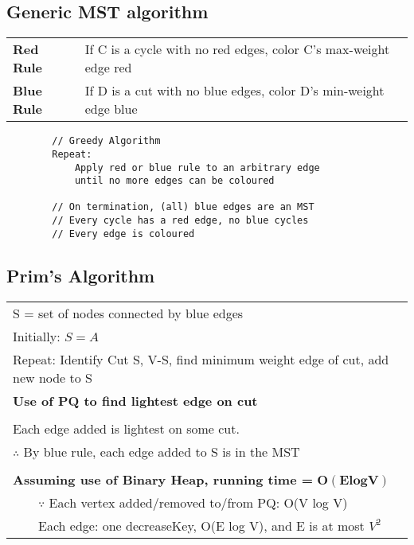 \documentclass{article}
\newcommand{\tabitem}{~~\llap{\textbullet}~~}
\begin{document}
    \subsection{Generic MST algorithm}


    \noindent\begin{tabular}{ll}
        \textbf{Red Rule} & If C is a cycle with no red edges, color C's max-weight edge red\\
        \textbf{Blue Rule} & If D is a cut with no blue edges, color D's min-weight edge blue\\
    \end{tabular}

    \begin{verbatim}
        // Greedy Algorithm
        Repeat: 
            Apply red or blue rule to an arbitrary edge
            until no more edges can be coloured

        // On termination, (all) blue edges are an MST
        // Every cycle has a red edge, no blue cycles
        // Every edge is coloured
    \end{verbatim}

    \pagebreak

    \subsection{Prim's Algorithm}

    \begin{tabular}{l}
        S  = set of nodes connected by blue edges\\
        Initially: $S = {A}$\\
        Repeat: Identify Cut {S, V-S}, find minimum weight edge of cut, add new node to S\\
        \textbf{Use of PQ to find lightest edge on cut}\\\\
        Each edge added is lightest on some cut.\\
        $\therefore$ By blue rule, each edge added to S is in the MST\\\\
        \textbf{Assuming use of Binary Heap, running time = } $\bm{O(E log V)}$\\
        \tabitem $\because$ Each vertex added/removed to/from PQ: O(V log V)\\
        \tabitem Each edge: one decreaseKey, O(E log V), and E is at most $V^{2}$\\
    \end{tabular}
\end{document}
